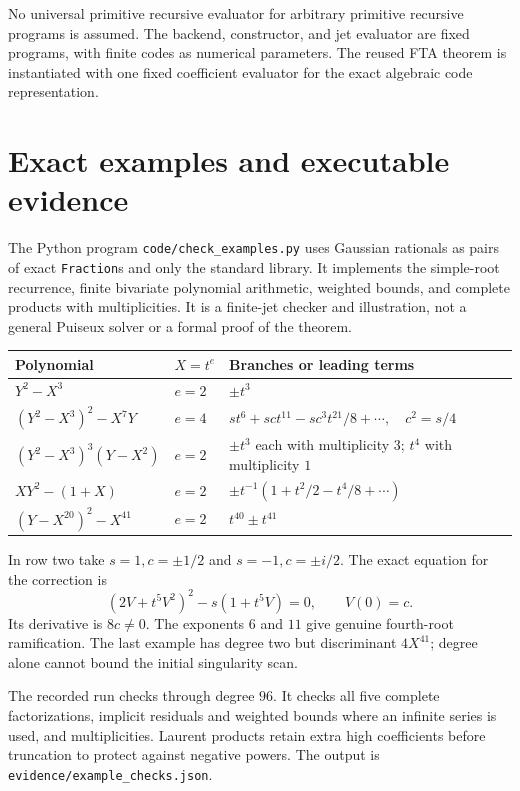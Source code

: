 \documentclass[11pt]{article}
\theoremstyle{definition}
\begin{document}
No universal primitive recursive evaluator for arbitrary primitive
recursive programs is assumed. The backend, constructor, and jet evaluator
are fixed programs, with finite codes as numerical parameters.
The reused FTA theorem is instantiated with one fixed coefficient evaluator
for the exact algebraic code representation.

\section{Exact examples and executable evidence}
\label{sec:examples}
The Python program \texttt{code/check\_examples.py} uses Gaussian rationals
as pairs of exact \texttt{Fraction}s and only the standard library.
It implements the simple-root recurrence, finite bivariate polynomial
arithmetic, weighted bounds, and complete products with multiplicities.
It is a finite-jet checker and illustration, not a general Puiseux solver
or a formal proof of the theorem.

\begin{center}
\small
\begin{tabular}{p{.35\linewidth}p{.10\linewidth}p{.44\linewidth}}
\toprule
Polynomial & \(X=t^e\) & Branches or leading terms\\
\midrule
\(Y^2-X^3\) & \(e=2\) & \(\pm t^3\)\\
\((Y^2-X^3)^2-X^7Y\) & \(e=4\) &
\(s t^6+s c t^{11}-s c^3t^{21}/8+\cdots,\quad c^2=s/4\)\\
\((Y^2-X^3)^3(Y-X^2)\) & \(e=2\) &
\(\pm t^3\) each with multiplicity \(3\); \(t^4\) with multiplicity \(1\)\\
\(XY^2-(1+X)\) & \(e=2\) &
\(\pm t^{-1}(1+t^2/2-t^4/8+\cdots)\)\\
\((Y-X^{20})^2-X^{41}\) & \(e=2\) &
\(t^{40}\pm t^{41}\)\\
\bottomrule
\end{tabular}
\end{center}
In row two take \(s=1,c=\pm1/2\) and \(s=-1,c=\pm i/2\). The exact equation
for the correction is
\[
 (2V+t^5V^2)^2-s(1+t^5V)=0,\qquad V(0)=c.
\]
Its derivative is \(8c\ne0\). The exponents \(6\) and \(11\) give genuine
fourth-root ramification. The last example has degree two but discriminant
\(4X^{41}\); degree alone cannot bound the initial singularity scan.

The recorded run checks through degree \(96\). It checks all five complete
factorizations, implicit residuals and weighted bounds where an infinite
series is used, and multiplicities. Laurent products retain extra high
coefficients before truncation to protect against negative powers.
The output is \texttt{evidence/example\_checks.json}.
\end{document}
